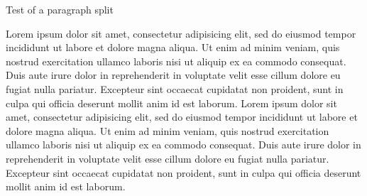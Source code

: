 \documentclass[11t, letterpaper]{awesome-cover}
\begin{document}
\makecvheader

\makelettertitle

\begin{cvletter}
    Test of a paragraph split
    
    Lorem ipsum dolor sit amet, consectetur adipisicing elit, sed do eiusmod tempor incididunt ut labore et dolore magna aliqua. Ut enim ad minim veniam, quis nostrud exercitation ullamco laboris nisi ut aliquip ex ea commodo consequat. Duis aute irure dolor in reprehenderit in voluptate velit esse cillum dolore eu fugiat nulla pariatur. Excepteur sint occaecat cupidatat non proident, sunt in culpa qui officia deserunt mollit anim id est laborum. %
    Lorem ipsum dolor sit amet, consectetur adipisicing elit, sed do eiusmod tempor incididunt ut labore et dolore magna aliqua. Ut enim ad minim veniam, quis nostrud exercitation ullamco laboris nisi ut aliquip ex ea commodo consequat. Duis aute irure dolor in reprehenderit in voluptate velit esse cillum dolore eu fugiat nulla pariatur. Excepteur sint occaecat cupidatat non proident, sunt in culpa qui officia deserunt mollit anim id est laborum.
\end{cvletter}

\makeletterclosing
\end{document}
